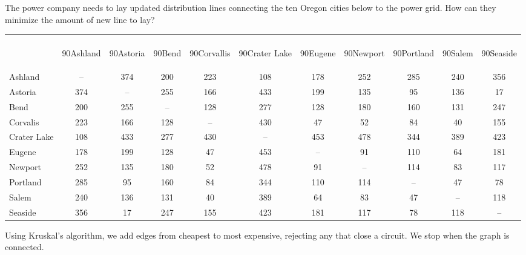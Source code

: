 \documentclass{beamer}
\begin{document}
\begin{frame}
The power company needs to lay updated distribution lines connecting the ten Oregon cities below to the power grid.  How can they minimize the amount of new line to lay?
 {\small
\begin{center}
\begin{tabular}{|l|c|c|c|c|c|c|c|c|c|c|}
\hline
&&&&&&&&&&\\[7ex]
& \begin{rotate}{90}Ashland \end{rotate}& \begin{rotate}{90}Astoria\end{rotate}  & \begin{rotate}{90}Bend \end{rotate}& \begin{rotate}{90}Corvallis \end{rotate} & \begin{rotate}{90}Crater Lake \end{rotate} &  \begin{rotate}{90}Eugene  \end{rotate}&  \begin{rotate}{90}Newport \end{rotate} &  \begin{rotate}{90}Portland  \end{rotate}& \begin{rotate}{90}Salem \end{rotate} &  \begin{rotate}{90}Seaside \end{rotate}\\
\hline
Ashland & --&374&200&223&108&178&252&285&240&356\\
\hline
Astoria & 374&--&255&166&433&199&135&95&136&17\\
\hline
Bend & 200 & 255 &--&128&277&128&180 & 160&131&247\\
\hline
Corvalis&223&166&128&--&430&47&52&84&40&155\\
\hline
Crater Lake &108&433&277&430&--&453&478&344&389&423\\
\hline
Eugene &178&199&128&47&453&--&91&110&64&181\\
\hline
Newport&252&135&180&52&478&91&--&114&83&117\\
\hline
Portland &285&95&160&84&344&110&114&--&47&78\\
\hline
Salem & 240 &136&131&40&389&64&83&47&--&118\\
\hline
Seaside&356&17&247&155&423&181&117&78&118&--\\
\hline
\end{tabular}
\end{center}
}
Using Kruskal's algorithm, we add edges from cheapest to most expensive, rejecting any that close a circuit.  We stop when the graph is connected.\\
\end{frame}
\end{document}
